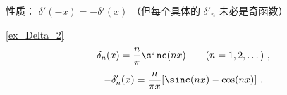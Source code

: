 性质： $\delta'(-x) = -\delta'(x)$ （但每个具体的 $\delta'_n$ 未必是奇函数）

\begin{example}{}
\autoref{ex_Delta_2}~
\begin{equation}
\delta_n(x) = \frac{n}{\pi}\sinc(n x) \qquad (n = 1, 2, \dots)~,
\end{equation}
\begin{equation}
-\delta'_n(x) = \frac{n}{\pi x} [\sinc(nx) - \cos(nx)]~.
\end{equation}
\end{example}
